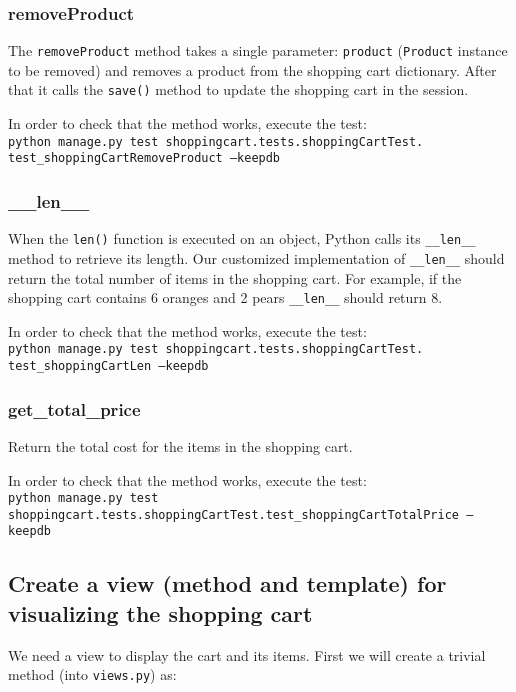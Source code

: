 \documentclass[12pt]{article} %
\newcommand{\ttt}[1]{\texttt{#1}}%
\newcommand{\views}{\texttt{views.py}}%
\begin{document}
\subsubsection{removeProduct}

The \ttt{removeProduct} method takes a single parameter: \ttt{product} (\ttt{Product} instance to be removed) and removes a product from the shopping cart dictionary. After that it calls the \ttt{save()} method to update the shopping cart in the session.

In order to check that the method works, execute the test:\\ \ttt{python manage.py test shoppingcart.tests.shoppingCartTest.\\test\_shoppingCartRemoveProduct --keepdb}

\subsubsection{\_\_len\_\_}

When the \ttt{len()} function is executed on an object, Python calls its \ttt{\_\_len\_\_} method to retrieve its length. Our customized implementation of \ttt{\_\_len\_\_} should return  the  total number of items  in the shopping cart. For example, if the shopping cart contains 6 oranges and 2 pears \ttt{\_\_len\_\_} should return 8.
 
In order to check that the method works, execute the test:\\ \ttt{python manage.py test shoppingcart.tests.shoppingCartTest.\\test\_shoppingCartLen --keepdb}


\subsubsection{get\_total\_price}
Return the total cost for the items in the shopping cart.

In order to check that the method works, execute the test:\\ \ttt{python manage.py test shoppingcart.tests.shoppingCartTest.test\_shoppingCartTotalPrice --keepdb}

\subsection{Create a view (method and template) for visualizing the shopping cart}
We need a view to display the cart and its items. First we will create a trivial method (into \views) as:
\end{document}
